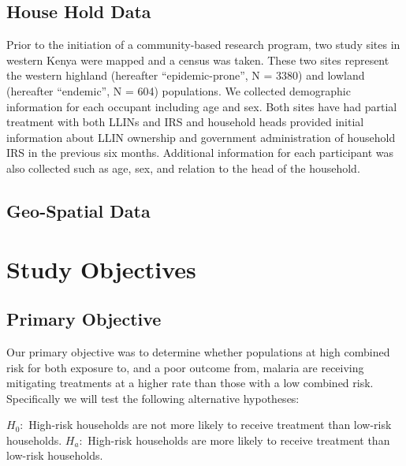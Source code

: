 \documentclass{article}\usepackage[]{graphicx}\usepackage[]{color}
\makeatletter
\newenvironment{kframe}{%
 \def\at@end@of@kframe{}%
 \ifinner\ifhmode%
  \def\at@end@of@kframe{\end{minipage}}%
  \begin{minipage}{\columnwidth}%
 \fi\fi%
 \def\FrameCommand##1{\hskip\@totalleftmargin \hskip-\fboxsep
 \colorbox{shadecolor}{##1}\hskip-\fboxsep
     \hskip-\linewidth \hskip-\@totalleftmargin \hskip\columnwidth}%
 \MakeFramed {\advance\hsize-\width
   \@totalleftmargin\z@ \linewidth\hsize
   \@setminipage}}%
 {\par\unskip\endMakeFramed%
 \at@end@of@kframe}
\makeatother
\begin{document}
\subsection{House Hold Data}
Prior to the initiation of a community-based research program,  two study sites in western Kenya were mapped and a census was taken. These two sites represent the western highland (hereafter “epidemic-prone”,  N = 3380) and lowland (hereafter “endemic”,  N = 604) populations. We collected demographic information for each occupant including age and sex. Both sites have had partial treatment with both LLINs and IRS and household heads provided initial information about LLIN ownership and government administration of household IRS in the previous six months. Additional information for each participant was also collected such as age,  sex,  and relation to the head of the household.\\

\begin{kframe}


{\ttfamily\noindent\bfseries\color{errorcolor}{\#\# Error in library(BDSS): there is no package called 'BDSS'}}\end{kframe}






\subsection{Geo-Spatial Data}


\section{Study Objectives}

\subsection{Primary Objective}

Our primary objective was to determine whether populations at high combined risk for both exposure to,  and a poor outcome from,  malaria are receiving mitigating treatments at a higher rate than those with a low combined risk. Specifically we will test the following alternative hypotheses:

$H_0:$ High-risk households are not more likely to receive treatment than low-risk households.  
$H_a:$ High-risk households are more likely to receive treatment than low-risk households.
\end{document}
